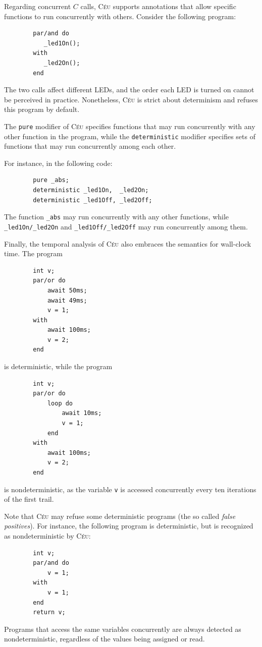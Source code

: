 \documentclass[11pt,a4paper]{article}
\newcommand{\2}{\;\;}
\newcommand{\5}{\;\;\;\;\;}
\newcommand{\CEU}{\textsc{C\'{e}u}}
\newcommand{\code}[1] {{\small{\texttt{#1}}}}
\begin{document}

Regarding concurrent $C$ calls, \CEU{} supports annotations that allow specific 
functions to run concurrently with others.
Consider the following program:
{\small
\begin{verbatim}
        par/and do
           _led1On();
        with
           _led2On();
        end
\end{verbatim}
}
The two calls affect different LEDs, and the order each LED is turned on cannot 
be perceived in practice.
Nonetheless, \CEU{} is strict about determinism and refuses this program by 
default.

The \code{pure} modifier of \CEU{} specifies functions that may run 
concurrently with any other function in the program, while the 
\code{deterministic} modifier specifies sets of functions that may run 
concurrently among each other.

For instance, in the following code:
{\small
\begin{verbatim}
        pure _abs;
        deterministic _led1On,  _led2On;
        deterministic _led1Off, _led2Off;
\end{verbatim}
}
The function \code{\_abs} may run concurrently with any other functions, while 
\code{\_led1On/\_led2On} and \code{\_led1Off/\_led2Off} may run concurrently 
among them.


Finally, the temporal analysis of \CEU{} also embraces the semantics for 
wall-clock time.
The program
{\small
\begin{verbatim}
        int v;
        par/or do
            await 50ms;
            await 49ms;
            v = 1;
        with
            await 100ms;
            v = 2;
        end
\end{verbatim}
}
is deterministic, while the program
{\small
\begin{verbatim}
        int v;
        par/or do
            loop do
                await 10ms;
                v = 1;
            end
        with
            await 100ms;
            v = 2;
        end
\end{verbatim}
}
is nondeterministic, as the variable \code{v} is accessed concurrently every 
ten iterations of the first trail.

Note that \CEU{} may refuse some deterministic programs (the so called 
\emph{false positives}).
For instance, the following program is deterministic, but is recognized as 
nondeterministic by \CEU:
{\small
\begin{verbatim}
        int v;
        par/and do
            v = 1;
        with
            v = 1;
        end
        return v;
\end{verbatim}
}
Programs that access the same variables concurrently are always detected as 
nondeterministic, regardless of the values being assigned or read.
\end{document}
